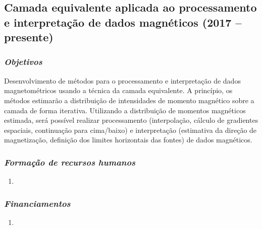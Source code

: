 \subsection{Camada equivalente aplicada ao processamento e interpretação de dados magnéticos (2017 -- presente)} \label{projeto-guarda-chuva-eqlayer}

\subsubsection{\emph{Objetivos}}

Desenvolvimento de métodos para o processamento e interpretação de dados magnetométricos 
usando a técnica da camada equivalente. A princípio, os métodos estimarão a distribuição 
de intensidades de momento magnético sobre a camada de forma iterativa. Utilizando a 
distribuição de momentos magnéticos estimada, será possível realizar processamento 
(interpolação, cálculo de gradientes espaciais, continuação para cima/baixo) e 
interpretação (estimativa da direção de magnetização, definição dos limites horizontais 
das fontes) de dados magnéticos. 


\subsubsection{\emph{Formação de recursos humanos}}

\begin{enumerate}
	
	\item{}
	
\end{enumerate}

\subsubsection{\emph{Financiamentos}}

\begin{enumerate}
	
	\item{}
	
\end{enumerate}

